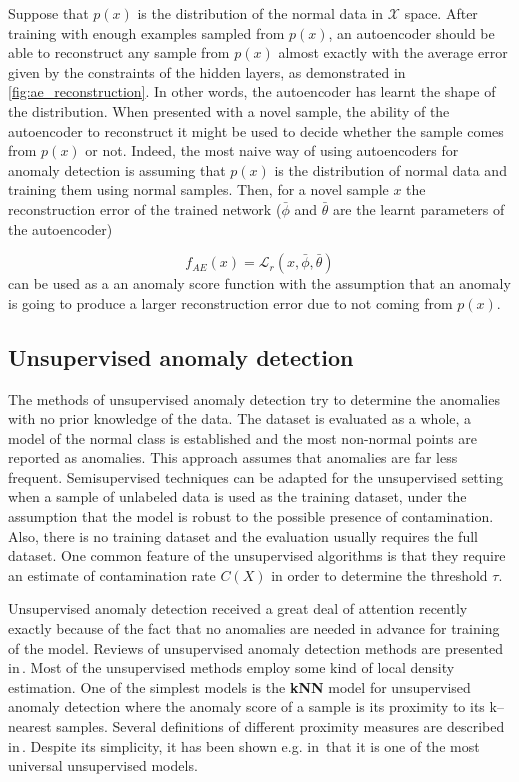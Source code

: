 Suppose that $p(x)$ is the distribution of the normal data in $\mathcal{X}$
space. After training with enough examples sampled from $p(x)$, an
autoencoder should be able to reconstruct any sample from $p(x)$
almost exactly with the average error given by the constraints of
the hidden layers, as demonstrated in \ref{fig:ae_reconstruction}.
In other words, the autoencoder has learnt the shape of the distribution.
When presented with a novel sample, the ability of the autoencoder
to reconstruct it might be used to decide whether the sample comes
from $p(x)$ or not. Indeed, the most naive way of using autoencoders
for anomaly detection is assuming that $p(x)$ is the distribution
of normal data and training them using normal samples. Then, for a
novel sample $x$ the reconstruction error of the trained network
($\bar{\phi}$ and $\bar{\theta}$ are the learnt parameters of the
autoencoder)

\begin{equation}
f_{AE}(x)=\mathcal{L}_{r}(x,\bar{\phi},\bar{\theta})\label{eq:ae_score}
\end{equation}
can be used as a an anomaly score function with the assumption that
an anomaly is going to produce a larger reconstruction error due to
not coming from $p(x)$.

\subsection{Unsupervised anomaly detection}

The methods of unsupervised anomaly detection try to determine the
anomalies with no prior knowledge of the data. The dataset is evaluated
as a whole, a model of the normal class is established and the most
non-normal points are reported as anomalies. This approach assumes
that anomalies are far less frequent. Semisupervised techniques can
be adapted for the unsupervised setting when a sample of unlabeled
data is used as the training dataset, under the assumption that the
model is robust to the possible presence of contamination. Also, there
is no training dataset and the evaluation usually requires the full
dataset. One common feature of the unsupervised algorithms is that
they require an estimate of contamination rate $C(X)$ in order to
determine the threshold $\tau$.

Unsupervised anomaly detection received a great deal of attention
recently exactly because of the fact that no anomalies are needed
in advance for training of the model. Reviews of unsupervised anomaly
detection methods are presented in\,\cite{goldstein2016comparative,campos2016evaluation,chandola2009anomaly}.
Most of the unsupervised methods employ some kind of local density
estimation. One of the simplest models is the \textbf{kNN} model for
unsupervised anomaly detection where the anomaly score of a sample
is its proximity to its k--nearest samples. Several definitions of
different proximity measures are described in\,\cite{harmeling2006outliers}.
Despite its simplicity, it has been shown e.g. in\,\cite{campos2016evaluation}
that it is one of the most universal unsupervised models.

